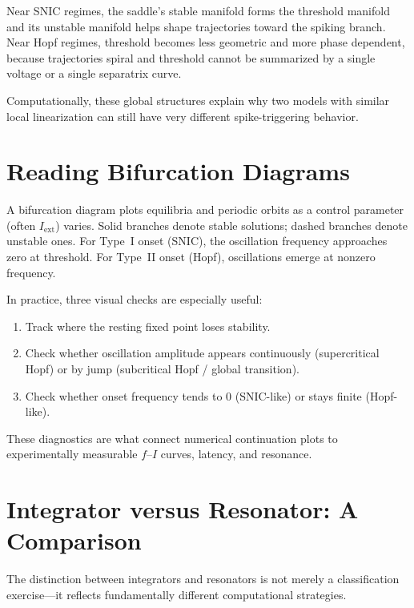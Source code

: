 Near SNIC regimes, the saddle's stable manifold forms the threshold manifold and its unstable manifold helps shape trajectories toward the spiking branch. Near Hopf regimes, threshold becomes less geometric and more phase dependent, because trajectories spiral and threshold cannot be summarized by a single voltage or a single separatrix curve.

Computationally, these global structures explain why two models with similar local linearization can still have very different spike-triggering behavior.

\section{Reading Bifurcation Diagrams}
\label{sec:bif-diagrams}

A bifurcation diagram plots equilibria and periodic orbits as a control parameter (often $I_{\text{ext}}$) varies. Solid branches denote stable solutions; dashed branches denote unstable ones. For Type~I onset (SNIC), the oscillation frequency approaches zero at threshold. For Type~II onset (Hopf), oscillations emerge at nonzero frequency.

In practice, three visual checks are especially useful:
\begin{enumerate}
  \item Track where the resting fixed point loses stability.
  \item Check whether oscillation amplitude appears continuously (supercritical Hopf) or by jump (subcritical Hopf / global transition).
  \item Check whether onset frequency tends to $0$ (SNIC-like) or stays finite (Hopf-like).
\end{enumerate}

These diagnostics are what connect numerical continuation plots to experimentally measurable $f$--$I$ curves, latency, and resonance.

\section{Integrator versus Resonator: A Comparison}
\label{sec:comparison}

The distinction between integrators and resonators is not merely a classification exercise---it reflects fundamentally different computational strategies.

